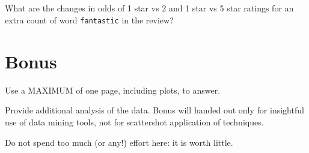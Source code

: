 \documentclass[12pt]{article}
\begin{document}
\subsection{} What are the changes in odds of 1 star vs 2 and 1 star vs 5 star ratings for an extra count of word {\tt fantastic} in the review?

\medskip
\section*{Bonus}

{\sc Use a MAXIMUM of one page, including plots, to answer.}

\medskip \noindent
Provide  additional analysis of the data.  Bonus will handed out only for insightful use of data mining tools, not for scattershot application of techniques.

\medskip \noindent
Do not spend too much (or any!) effort here: it is worth little.  
\end{document}
